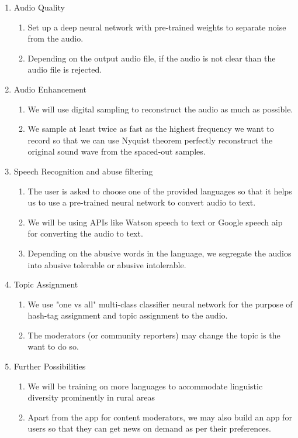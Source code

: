 \documentclass[11pt]{article}
\begin{document}
		\begin{enumerate}
			\item Audio Quality
			\begin{enumerate}
				\item
					Set up a deep neural network with pre-trained weights to separate noise from the audio.
				\item
					Depending on the output audio file, if the audio is not clear than the audio file is rejected.
			\end{enumerate}
			\item Audio Enhancement
			\begin{enumerate}
				\item
					We will use digital sampling to reconstruct the audio as much as possible.
				\item
					We sample at least twice as fast as the highest frequency we want to record so that we can use Nyquist theorem perfectly reconstruct the original sound wave from the spaced-out samples.				
			\end{enumerate}
			\item Speech Recognition and abuse filtering
			\begin{enumerate}
				\item
					The user is asked to choose one of the provided languages so that it helps us to use a pre-trained neural network to convert audio to text.
                \item
					We will be using APIs like Watson speech to text or Google speech aip for converting the audio to text.
				\item
					Depending on the abusive words in the language, we segregate the audios into abusive tolerable or abusive intolerable.
			\end{enumerate}
			\item Topic Assignment
			\begin{enumerate}
				\item
					We use "one vs all" multi-class classifier neural network for the purpose of hash-tag assignment and topic assignment to the audio.
                \item
					The moderators (or community reporters) may change the topic is the want to do so.
			\end{enumerate}
			\item Further Possibilities
			\begin{enumerate}
				\item
				    We will be training on more languages to accommodate linguistic diversity prominently in rural areas
				\item
				    Apart from the app for content moderators, we may also build an app for users so that they can get news on demand as per their preferences.
			\end{enumerate}
		\end{enumerate}
\end{document}
